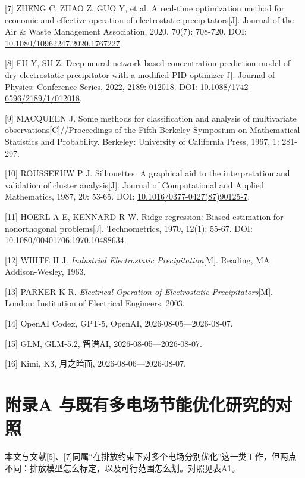 \documentclass[UTF8,zihao=5,a4paper]{ctexart}
\begin{document}
[7] ZHENG C, ZHAO Z, GUO Y, et al. A real-time optimization method for economic and effective operation of electrostatic precipitators[J]. Journal of the Air \& Waste Management Association, 2020, 70(7): 708-720. DOI: \url{10.1080/10962247.2020.1767227}.

[8] FU Y, SU Z. Deep neural network based concentration prediction model of dry electrostatic precipitator with a modified PID optimizer[J]. Journal of Physics: Conference Series, 2022, 2189: 012018. DOI: \url{10.1088/1742-6596/2189/1/012018}.

[9] MACQUEEN J. Some methods for classification and analysis of multivariate observations[C]//Proceedings of the Fifth Berkeley Symposium on Mathematical Statistics and Probability. Berkeley: University of California Press, 1967, 1: 281-297.

[10] ROUSSEEUW P J. Silhouettes: A graphical aid to the interpretation and validation of cluster analysis[J]. Journal of Computational and Applied Mathematics, 1987, 20: 53-65. DOI: \url{10.1016/0377-0427(87)90125-7}.

[11] HOERL A E, KENNARD R W. Ridge regression: Biased estimation for nonorthogonal problems[J]. Technometrics, 1970, 12(1): 55-67. DOI: \url{10.1080/00401706.1970.10488634}.

[12] WHITE H J. \textit{Industrial Electrostatic Precipitation}[M]. Reading, MA: Addison-Wesley, 1963.

[13] PARKER K R. \textit{Electrical Operation of Electrostatic Precipitators}[M]. London: Institution of Electrical Engineers, 2003.

[14] OpenAI Codex, GPT-5, OpenAI, 2026-08-05—2026-08-07.

[15] GLM, GLM-5.2, 智谱AI, 2026-08-05—2026-08-07.

[16] Kimi, K3, 月之暗面, 2026-08-06—2026-08-07.

\section*{附录A 与既有多电场节能优化研究的对照}

本文与文献[5]、[7]同属“在排放约束下对多个电场分别优化”这一类工作，但两点不同：排放模型怎么标定，以及可行范围怎么划。对照见表A1。
\end{document}

